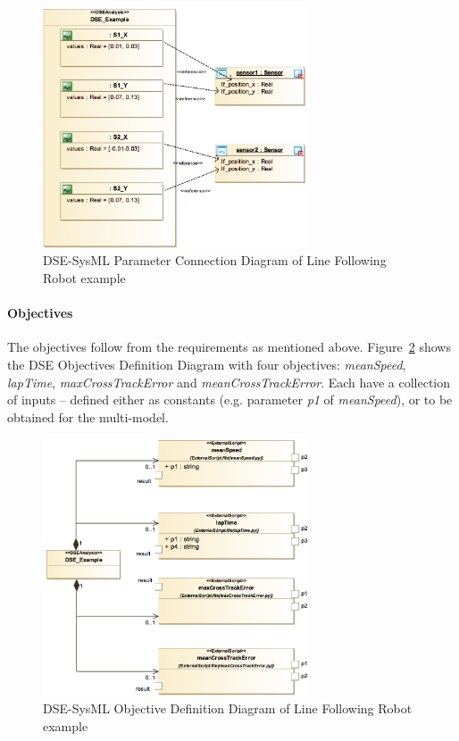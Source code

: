 \begin{figure}[htbp]
	\centering
	\includegraphics[width=0.7\textwidth]{figures/LFR_DSE_Param2}
\caption{DSE-SysML Parameter Connection Diagram of Line Following Robot example}
\label{fig:dse_lfr_param2}
\end{figure}

\paragraph{Objectives}    The objectives follow from the requirements as mentioned above. Figure~\ref{fig:dse_lfr_obj} shows the DSE Objectives Definition Diagram with four objectives:  \emph{meanSpeed}, \emph{lapTime}, \emph{maxCrossTrackError} and \emph{meanCrossTrackError}. Each have a collection of inputs -- defined either as constants (e.g. parameter \emph{p1} of \emph{meanSpeed}), or to be obtained for the multi-model.

\begin{figure}[htbp]
	\centering
	\includegraphics[width=0.7\textwidth]{figures/LFR_DSE_Obj}
\caption{DSE-SysML Objective Definition Diagram of Line Following Robot example}
\label{fig:dse_lfr_obj}
\end{figure}


